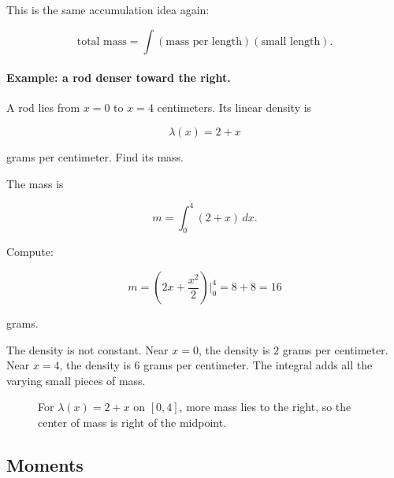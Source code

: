 This is the same accumulation idea again:

\[
\boxed{
\text{total mass}=\int(\text{mass per length})(\text{small length}).
}
\]

\paragraph{Example: a rod denser toward the right.}
A rod lies from \(x=0\) to \(x=4\) centimeters.  Its linear density is

\[
\lambda(x)=2+x
\]

grams per centimeter.  Find its mass.

The mass is

\[
m=\int_0^4 (2+x)\,dx.
\]

Compute:

\[
m=
\left(2x+\frac{x^2}{2}\right)\Big|_0^4
=
8+8
=
\boxed{16}
\]

grams.

The density is not constant.  Near \(x=0\), the density is \(2\) grams per centimeter.
Near \(x=4\), the density is \(6\) grams per centimeter.  The integral adds all the
varying small pieces of mass.

\begin{figure}[h]
\centering
{}
\caption{For \(\lambda(x)=2+x\) on \([0,4]\), more mass lies to the right, so the center of mass is right of the midpoint.}
\label{fig:rod-density-center-mass}
\end{figure}

\subsection{Moments}
\label{subsec:moments}

